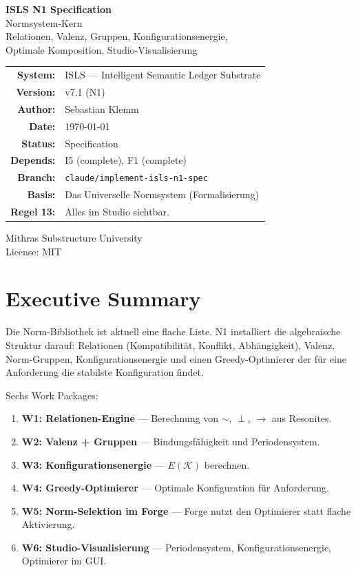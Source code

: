 \documentclass[11pt,a4paper]{article}
\begin{document}
\begin{titlepage}\centering\vspace*{2.5cm}
{\Huge\bfseries\color{isls-blue} ISLS N1 Specification}\\[0.5cm]
{\LARGE\color{isls-orange} Normsystem-Kern}\\[0.3cm]
{\large\color{isls-gray} Relationen, Valenz, Gruppen, Konfigurationsenergie,\\Optimale Komposition, Studio-Visualisierung}\\[2cm]
{\large\begin{tabular}{rl}
\textbf{System:} & ISLS --- Intelligent Semantic Ledger Substrate \\
\textbf{Version:} & v7.1 (N1) \\
\textbf{Author:} & Sebastian Klemm \\
\textbf{Date:} & \today \\
\textbf{Status:} & Specification \\
\textbf{Depends:} & I5 (complete), F1 (complete) \\
\textbf{Branch:} & \texttt{claude/implement-isls-n1-spec} \\
\textbf{Basis:} & Das Universelle Normsystem (Formalisierung) \\
\textbf{Regel 13:} & Alles im Studio sichtbar.
\end{tabular}}
\vfill{\small\color{isls-gray}Mithras Substructure University\\License: MIT}
\end{titlepage}
\tableofcontents\newpage

\section{Executive Summary}

Die Norm-Bibliothek ist aktuell eine flache Liste. N1 installiert die algebraische Struktur darauf: Relationen (Kompatibilit\"at, Konflikt, Abh\"angigkeit), Valenz, Norm-Gruppen, Konfigurationsenergie und einen Greedy-Optimierer der f\"ur eine Anforderung die stabilste Konfiguration findet.

Sechs Work Packages:

\begin{enumerate}[nosep]
\item \textbf{W1: Relationen-Engine} --- Berechnung von $\sim$, $\perp$, $\to$ aus Resonites.
\item \textbf{W2: Valenz + Gruppen} --- Bindungsf\"ahigkeit und Periodensystem.
\item \textbf{W3: Konfigurationsenergie} --- $E(\mathcal{K})$ berechnen.
\item \textbf{W4: Greedy-Optimierer} --- Optimale Konfiguration f\"ur Anforderung.
\item \textbf{W5: Norm-Selektion im Forge} --- Forge nutzt den Optimierer statt flache Aktivierung.
\item \textbf{W6: Studio-Visualisierung} --- Periodensystem, Konfigurationsenergie, Optimierer im GUI.
\end{enumerate}
\end{document}
